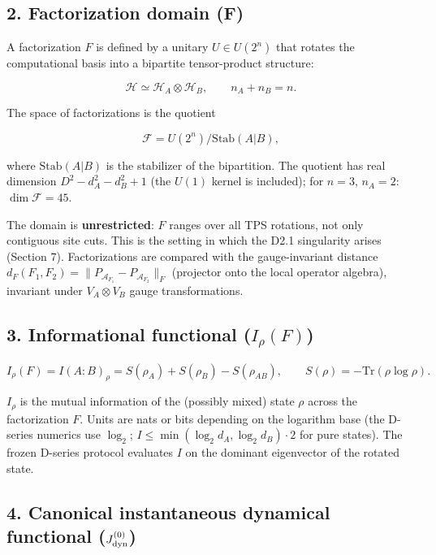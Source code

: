 \documentclass[
]{article}
\begin{document}
\subsection{2. Factorization domain (F)}\label{factorization-domain-f}

A factorization \(F\) is defined by a unitary \(U \in U(2^n)\) that
rotates the computational basis into a bipartite tensor-product
structure:

\[
\mathcal H \simeq \mathcal H_A \otimes \mathcal H_B,\qquad
n_A + n_B = n .
\]

The space of factorizations is the quotient

\[
\mathcal F = U(2^n)\big/ \mathrm{Stab}(A|B),
\]

where \(\mathrm{Stab}(A|B)\) is the stabilizer of the bipartition. The
quotient has real dimension \(D^2 - d_A^2 - d_B^2 + 1\) (the \(U(1)\)
kernel is included); for \(n=3\), \(n_A=2\): \(\dim \mathcal F = 45\).

The domain is \textbf{unrestricted}: \(F\) ranges over all TPS
rotations, not only contiguous site cuts. This is the setting in which
the D2.1 singularity arises (Section 7). Factorizations are compared
with the gauge-invariant distance
\(d_F(F_1,F_2) = \|P_{\mathcal A_{F_1}} - P_{\mathcal A_{F_2}}\|_F\)
(projector onto the local operator algebra), invariant under
\(V_A \otimes V_B\) gauge transformations.

\subsection{\texorpdfstring{3. Informational functional
(\(I_\rho(F)\))}{3. Informational functional (I\_\textbackslash rho(F))}}\label{informational-functional-i_rhof}

\[
I_\rho(F) = I(A:B)_\rho = S(\rho_A) + S(\rho_B) - S(\rho_{AB}),
\qquad
S(\rho) = -\mathrm{Tr}(\rho\log\rho).
\]

\(I_\rho\) is the mutual information of the (possibly mixed) state
\(\rho\) across the factorization \(F\). Units are nats or bits
depending on the logarithm base (the D-series numerics use \(\log_2\);
\(I \le \min(\log_2 d_A,
\log_2 d_B)\cdot 2\) for pure states). The frozen D-series protocol
evaluates \(I\) on the dominant eigenvector of the rotated state.

\subsection{\texorpdfstring{4. Canonical instantaneous dynamical
functional
(\(J_{\rm dyn}^{(0)}\))}{4. Canonical instantaneous dynamical functional (J\_\{\textbackslash rm dyn\}\^{}\{(0)\})}}\label{canonical-instantaneous-dynamical-functional-j_rm-dyn0}
\end{document}
